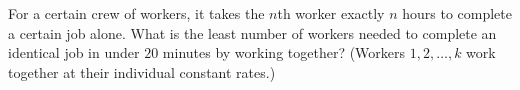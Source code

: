For a certain crew of workers, it takes the $n$th worker exactly $n$ hours to complete a certain job alone. What is the least number of workers needed to complete an identical job in under $20$ minutes by working together? (Workers $1,2,\dots,k$ work together at their individual constant rates.)
